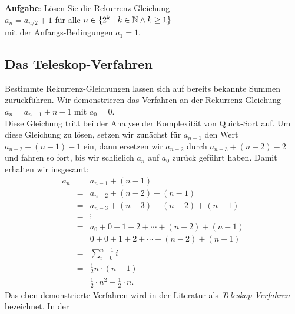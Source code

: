 \noindent
\textbf{Aufgabe}:  L\"osen Sie die Rekurrenz-Gleichung \\[0.1cm]
\hspace*{1.3cm} $a_{n} = a_{n/2} + 1$ \quad f\"ur alle $n \in \{ 2^k \mid k \in {\mathbb N} \wedge k \geq 1\}$\\[0.1cm]
mit der Anfangs-Bedingungen $a_1 = 1$.
\vspace*{0.3cm}


\subsection{Das Teleskop-Verfahren}
Bestimmte Rekurrenz-Gleichungen lassen sich auf bereits bekannte Summen zur\"uckf\"uhren.  Wir demonstrieren
das Verfahren an der Rekurrenz-Gleichung \\[0.2cm]
\hspace*{1.3cm} $a_n = a_{n-1} + n - 1$ \quad mit $a_0 = 0$. 
\\[0.2cm]
Diese Gleichung tritt bei der Analyse der Komplexit\"at von Quick-Sort auf.
Um diese Gleichung zu l\"osen, setzen wir zun\"achst f\"ur $a_{n-1}$ den Wert $a_{n-2} + (n-1) - 1$ ein, dann 
ersetzen wir $a_{n-2}$ durch $a_{n-3} + (n-2) -2$ und fahren so fort, bis wir schlie\3lich $a_n$ auf $a_0$
zur\"uck gef\"uhrt haben.
Damit erhalten wir insgesamt:
\[
\begin{array}{lcl}
  a_n & = & a_{n-1} + (n-1) \\
      & = & a_{n-2} + (n-2) + (n-1) \\
      & = & a_{n-3} + (n-3) + (n-2) + (n-1) \\
      & = & \vdots \\
      & = & a_{0} + 0 + 1 + 2 + \cdots  + (n-2) + (n-1) \\
      & = & 0 + 0 + 1 + 2 + \cdots  + (n-2) + (n-1) \\
      & = & \sum\limits_{i=0}^{n-1} i  \\[0.4cm]
      & = &  \frac{1}{2} n \cdot(n - 1) \\[0.2cm]
      & = & \frac{1}{2} \cdot n^2 - \frac{1}{2} \cdot n.
\end{array}
\]
Das eben demonstrierte Verfahren wird in der Literatur als \emph{Teleskop-Verfahren} bezeichnet.  In der
